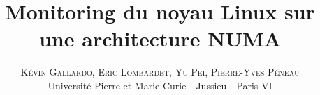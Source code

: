 \documentclass[twoside]{article}
\title{\vspace{-15mm}\fontsize{24pt}{10pt}\selectfont\textbf{Monitoring du noyau Linux sur une architecture NUMA}}
\author{
\large
\textsc{Kévin Gallardo, Eric Lombardet, Yu Pei, Pierre-Yves Péneau}\\[2mm] 
\normalsize Université Pierre et Marie Curie - Jussieu - Paris VI
\vspace{-5mm}
}
\date{}
\begin{document}
  \maketitle

  \thispagestyle{fancy}

  \begin{abstract}
    \noindent 
  \end{abstract}

  \begin{multicols}{2}
    
    
  \end{multicols}
\end{document}
